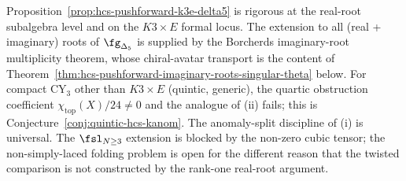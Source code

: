 \begin{remark}
\label{rem:hcs-pushforward-scope}
Proposition~\ref{prop:hcs-pushforward-k3e-delta5} is rigorous at the real-root subalgebra level and on the $K3 \times E$ formal locus. The extension to all (real + imaginary) roots of $\fg_{\Delta_5}$ is supplied by the Borcherds imaginary-root multiplicity theorem, whose chiral-avatar transport is the content of Theorem~\ref{thm:hcs-pushforward-imaginary-roots-singular-theta} below. For compact CY$_3$ other than $K3 \times E$ (quintic, generic), the quartic obstruction coefficient $\chi_{\mathrm{top}}(X)/24 \neq 0$ and the analogue of (ii) fails; this is Conjecture~\ref{conj:quintic-hcs-kanom}. The anomaly-split discipline of (i) is universal. The $\fsl_{N \geq 3}$ extension is blocked by the non-zero cubic tensor; the non-simply-laced folding problem is open for the different reason that the twisted comparison is not constructed by the rank-one real-root argument.
\end{remark}

